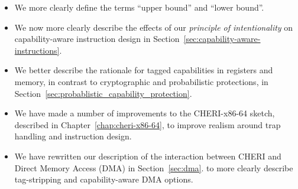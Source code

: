 \begin{itemize}
\item We more clearly define the terms ``upper bound'' and ``lower bound''.

\item We now more clearly describe the effects of our \textit{principle of
  intentionality} on capa\-bility-aware instruction design in
  Section~\ref{sec:capability-aware-instructions}.

\item We better describe the rationale for tagged capabilities in registers
  and memory, in contrast to cryptographic and probabilistic protections, in
  Section~\ref{sec:probablistic_capability_protection}.

\item We have made a number of improvements to the CHERI-x86-64 sketch,
  described in Chapter~\ref{chap:cheri-x86-64}, to improve realism around trap
  handling and instruction design.

\item We have rewritten our description of the interaction between CHERI and
  Direct Memory Access (DMA) in Section~\ref{sec:dma}. to more clearly
  describe tag-stripping and capability-aware DMA options.

\end{itemize}
